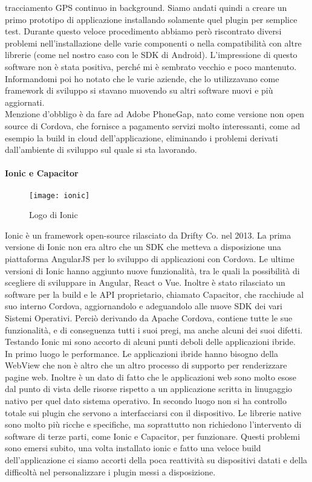 tracciamento GPS continuo in \gls{background}. Siamo andati quindi a creare un primo prototipo di applicazione installando solamente quel plugin per semplice
test. Durante questo veloce procedimento abbiamo però riscontrato diversi problemi nell'installazione delle varie componenti o nella compatibilità con altre
librerie (come nel nostro caso con le \gls{SDK} di Android). L'impressione di questo software non è stata positiva, perché mi è sembrato vecchio
e poco mantenuto. Informandomi poi ho notato che le varie aziende, che lo utilizzavano come framework di sviluppo si stavano muovendo su altri software nuovi e
più aggiornati.\\
Menzione d'obbligo è da fare ad Adobe PhoneGap, nato come versione non \gls{open source} di Cordova, che fornisce a pagamento servizi molto interessanti, come ad
esempio la build in cloud dell'applicazione, eliminando i problemi derivati dall'ambiente di sviluppo sul quale si sta lavorando.

\paragraph{Ionic e Capacitor}

\begin{figure}[h]
	\begin{center}
		\texttt{[image: ionic]}
		\caption{Logo di Ionic}
	\end{center}
\end{figure}

Ionic è un framework open-source rilasciato da Drifty Co. nel 2013. La prima versione di Ionic non era altro che un SDK che metteva a disposizione una
piattaforma AngularJS per lo sviluppo di applicazioni con Cordova. Le ultime versioni di Ionic hanno aggiunto nuove funzionalità, tra le
quali la possibilità di scegliere di sviluppare in Angular, React o Vue. Inoltre è stato rilasciato un software per la build e le API proprietario,
chiamato Capacitor, che racchiude al suo interno Cordova, aggiornandolo e adeguandolo alle nuove SDK dei vari Sistemi Operativi. Perciò derivando
da Apache Cordova, contiene tutte le sue funzionalità, e di conseguenza tutti i suoi pregi, ma anche alcuni dei suoi difetti. \\
Testando Ionic mi sono accorto di alcuni punti deboli delle applicazioni ibride. \\
In primo luogo le performance. Le applicazioni ibride hanno bisogno della WebView che non è altro che un altro processo di supporto per
renderizzare pagine web. Inoltre è un dato di fatto che le applicazioni web sono molto esose dal punto di vista delle risorse rispetto a un
applicazione scritta in linugaggio nativo per quel dato sistema operativo. In secondo luogo non si ha controllo totale sui plugin che
servono a interfacciarsi con il dispositivo. Le librerie native sono molto più ricche e specifiche, ma soprattutto non richiedono
l'intervento di software di terze parti, come Ionic e Capacitor, per funzionare. Questi problemi sono emersi subito, una volta installato
ionic e fatto una veloce build dell'applicazione ci siamo accorti della poca reattività su dispositivi datati e della difficoltà nel
personalizzare i plugin messi a disposizione. \\


